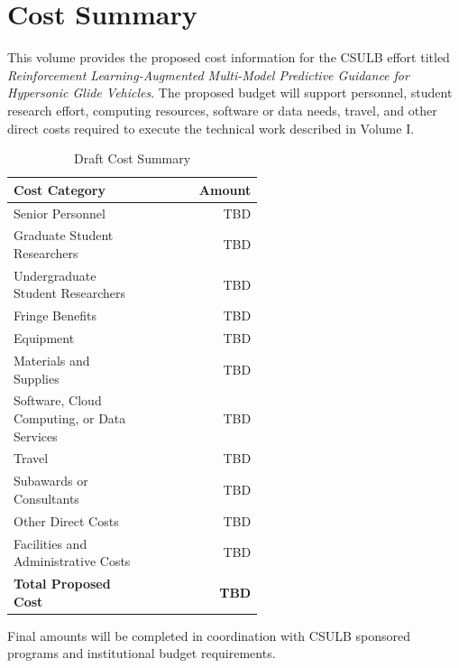 \section{Cost Summary}

This volume provides the proposed cost information for the CSULB effort titled \textit{Reinforcement Learning-Augmented Multi-Model Predictive Guidance for Hypersonic Glide Vehicles}. The proposed budget will support personnel, student research effort, computing resources, software or data needs, travel, and other direct costs required to execute the technical work described in Volume I.

\begin{table}[h]
\centering
\caption{Draft Cost Summary}
\begin{tabular}{p{0.55\linewidth}r}
\toprule
\textbf{Cost Category} & \textbf{Amount} \\
\midrule
Senior Personnel & TBD \\
Graduate Student Researchers & TBD \\
Undergraduate Student Researchers & TBD \\
Fringe Benefits & TBD \\
Equipment & TBD \\
Materials and Supplies & TBD \\
Software, Cloud Computing, or Data Services & TBD \\
Travel & TBD \\
Subawards or Consultants & TBD \\
Other Direct Costs & TBD \\
Facilities and Administrative Costs & TBD \\
\midrule
\textbf{Total Proposed Cost} & \textbf{TBD} \\
\bottomrule
\end{tabular}
\end{table}

Final amounts will be completed in coordination with CSULB sponsored programs and institutional budget requirements.

